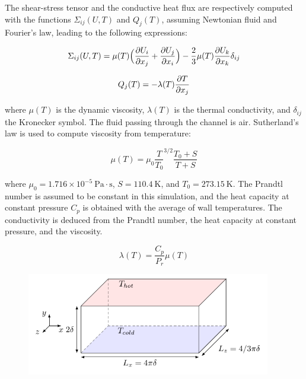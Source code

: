 The shear-stress tensor and the conductive heat flux are respectively computed with the functions $\Sigma_{ij}({U}, {T})$ and $Q_j({T})$, assuming Newtonian fluid and Fourier's law, leading to the following expressions:

\begin{equation}
    \Sigma_{ij}({U}, {T}) = \mu ({T}) \Big( \pfrac{{U_i}}{x_j} + \pfrac{{U_j}}{x_i}\Big) - \frac{2}{3}\mu({T}) \pfrac{{U_k}}{x_k} \delta_{ij}
\end{equation}

\begin{equation}
    Q_j({T}) = - \lambda({T})\pfrac{{T}}{x_j}
\end{equation}

where $\mu(T)$ is the dynamic viscosity, $\lambda(T)$ is the thermal conductivity, and $\delta_{ij}$ the Kronecker symbol.
The fluid passing through the channel is air. Sutherland's law \cite{sutherland_viscosity_1893} is used to compute viscosity from temperature:

\begin{equation}
    \mu(T) = \mu_0 \frac{T}{T_0}^{3/2} \frac{T_0 + S}{T + S}
\end{equation}

where $\mu_0 = 1.716 \times 10^{-5} \ \text{Pa}\cdot\text{s}$, $S = 110.4 \ \text{K}$, and $T_0 = 273.15 \ \text{K}$. The Prandtl number is assumed to be constant in this simulation, and the heat capacity at constant pressure $C_p$ is obtained with the average of wall temperatures. The conductivity is deduced from the Prandtl number, the heat capacity at constant pressure, and the viscosity.

\begin{equation}
    \lambda(T) = \frac{C_p}{P_r} \mu(T)
\end{equation}

\begin{figure}
  \begin{center}
    \includegraphics[width=0.95\textwidth]{canal_plan.pdf}
  \end{center}
  \caption{}
  \label{figure:canal_plan_anisotherme}
\end{figure}


